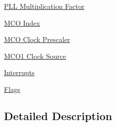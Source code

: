 \begin{DoxyCompactItemize}
\item 
\hyperlink{group___r_c_c___p_l_l___multiplication___factor}{P\-L\-L Multiplication Factor}
\item 
\hyperlink{group___r_c_c___m_c_o___index}{M\-C\-O Index}
\item 
\hyperlink{group___r_c_c___m_c_ox___clock___prescaler}{M\-C\-O Clock Prescaler}
\item 
\hyperlink{group___r_c_c___m_c_o1___clock___source}{M\-C\-O1 Clock Source}
\item 
\hyperlink{group___r_c_c___interrupt}{Interrupts}
\item 
\hyperlink{group___r_c_c___flag}{Flags}
\end{DoxyCompactItemize}


\subsection{Detailed Description}
